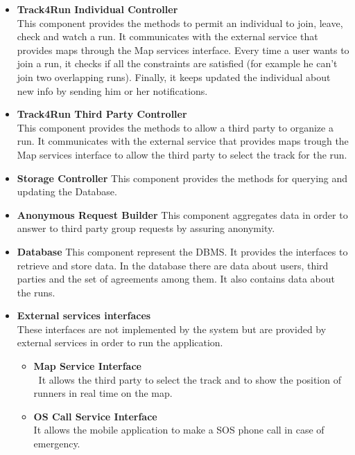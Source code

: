 \begin{legal}
\begin{itemize}
{				}\\
		\item{\textbf{Track4Run Individual Controller}\\
		This component provides the methods to permit an individual to join, leave, check and watch a run. It communicates with the external service that provides maps through the Map services interface. Every time a user wants to join a run, it checks if all the constraints are satisfied (for example he can't join two overlapping runs). Finally, it keeps updated the individual about new info by sending him or her notifications.
				}\\
		\item{\textbf{Track4Run Third Party Controller}\\
		This component provides the methods to allow a third party to organize a run. It communicates with the external service that provides maps trough the Map services interface to allow the third party to select the track for the run.
				}\\				
		\item{\textbf{Storage Controller}
		This component provides the methods for querying and updating the Database.
				}\\
		\item{\textbf{Anonymous Request Builder}
		This component aggregates data in order to answer to third party group requests by assuring anonymity.
				}\\
		\item{\textbf{Database}
		This component represent the DBMS. It provides the interfaces to retrieve and store data. In the database there are data about users, third parties and the set of agreements among them. It also contains data about the runs.
				}\\
		\item{\textbf{External services interfaces}\\
		These interfaces are not implemented by the system but are provided by external services in order to run the application.
      	\begin{itemize}
		  	\item{\textbf{Map Service Interface}\\\
		  	It allows the third party to select the track and to show the position of runners in real time on the map.
						}\\
			\item{\textbf{OS Call Service Interface}\\
			It allows the mobile application to make a SOS phone call in case of emergency.
}
\end{itemize}}
\end{itemize}
\end{legal}
